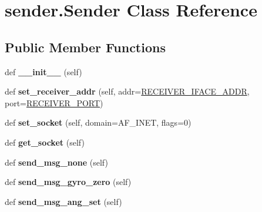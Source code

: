 \hypertarget{classsender_1_1Sender}{}\section{sender.\+Sender Class Reference}
\label{classsender_1_1Sender}
\subsection*{Public Member Functions}
\begin{DoxyCompactItemize}
\item 
def {\bfseries \+\_\+\+\_\+init\+\_\+\+\_\+} (self)\hypertarget{classsender_1_1Sender_a7b79b706bd9a43a150cfcfa8e02a2989}{}\label{classsender_1_1Sender_a7b79b706bd9a43a150cfcfa8e02a2989}

\item 
def {\bfseries set\+\_\+receiver\+\_\+addr} (self, addr=\hyperlink{protocol_8h_a03882e8e162387e0e8adcddd9f7249ab}{R\+E\+C\+E\+I\+V\+E\+R\+\_\+\+I\+F\+A\+C\+E\+\_\+\+A\+D\+DR}, port=\hyperlink{protocol_8h_a714d0c166e470fe1d95e17305a084931}{R\+E\+C\+E\+I\+V\+E\+R\+\_\+\+P\+O\+RT})\hypertarget{classsender_1_1Sender_ad1b88b08c7b240cd2bb91652cf98a74f}{}\label{classsender_1_1Sender_ad1b88b08c7b240cd2bb91652cf98a74f}

\item 
def {\bfseries set\+\_\+socket} (self, domain=A\+F\+\_\+\+I\+N\+ET, flags=0)\hypertarget{classsender_1_1Sender_af4173da2d3d3e9885c9990493db23a40}{}\label{classsender_1_1Sender_af4173da2d3d3e9885c9990493db23a40}

\item 
def {\bfseries get\+\_\+socket} (self)\hypertarget{classsender_1_1Sender_a91c858d2f60b46517b6e1077d5606427}{}\label{classsender_1_1Sender_a91c858d2f60b46517b6e1077d5606427}

\item 
def {\bfseries send\+\_\+msg\+\_\+none} (self)\hypertarget{classsender_1_1Sender_a5ce4a0fc4d1cc048a8c04de80e998d2a}{}\label{classsender_1_1Sender_a5ce4a0fc4d1cc048a8c04de80e998d2a}

\item 
def {\bfseries send\+\_\+msg\+\_\+gyro\+\_\+zero} (self)\hypertarget{classsender_1_1Sender_ac451dfa2da01fa2095e0693581d5bc89}{}\label{classsender_1_1Sender_ac451dfa2da01fa2095e0693581d5bc89}

\item 
def {\bfseries send\+\_\+msg\+\_\+ang\+\_\+set} (self)\hypertarget{classsender_1_1Sender_ac32bc74c5e90e33a9a3847443a695f84}{}\label{classsender_1_1Sender_ac32bc74c5e90e33a9a3847443a695f84}


\end{DoxyCompactItemize}
